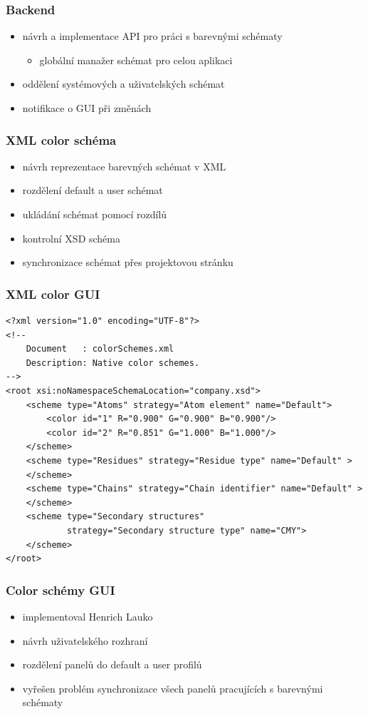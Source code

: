 \documentclass[slovak]{beamer}
\begin{document}
\begin{frame}
\frametitle{Backend}
	\begin{itemize}
		\item návrh a implementace API pro práci s barevnými schématy
		\begin{itemize}
			\item globální manažer schémat pro celou aplikaci
		\end{itemize}
		\item oddělení systémových a uživatelských schémat
		\item notifikace o GUI při změnách
	\end{itemize}
\end{frame}

\begin{frame}
\frametitle{XML color schéma}
	\begin{itemize}
		\item návrh reprezentace barevných schémat v XML
		\item rozdělení default a user schémat
		\item ukládání schémat pomocí rozdílů
		\item kontrolní XSD schéma
		\item synchronizace schémat přes projektovou stránku
	\end{itemize}
\end{frame}

\begin{frame}[fragile]
\frametitle{XML color GUI}
	\lstset{language=XML}
	\scriptsize{
	\begin{lstlisting}
<?xml version="1.0" encoding="UTF-8"?>
<!--
    Document   : colorSchemes.xml
    Description: Native color schemes.
-->
<root xsi:noNamespaceSchemaLocation="company.xsd">
    <scheme type="Atoms" strategy="Atom element" name="Default">
        <color id="1" R="0.900" G="0.900" B="0.900"/>
        <color id="2" R="0.851" G="1.000" B="1.000"/>
    </scheme>
    <scheme type="Residues" strategy="Residue type" name="Default" >  
    </scheme>
    <scheme type="Chains" strategy="Chain identifier" name="Default" >
    </scheme>
    <scheme type="Secondary structures" 
	        strategy="Secondary structure type" name="CMY">
    </scheme>
</root>
	\end{lstlisting}}
\end{frame}

\begin{frame}
\frametitle{Color schémy GUI}
	\begin{itemize}
		\item implementoval Henrich Lauko
		\item návrh uživatelského rozhraní
		\item rozdělení panelů do default a user profilů
		\item vyřešen problém synchronizace všech panelů pracujících s barevnými schématy
	\end{itemize}
\end{frame}
\end{document}
